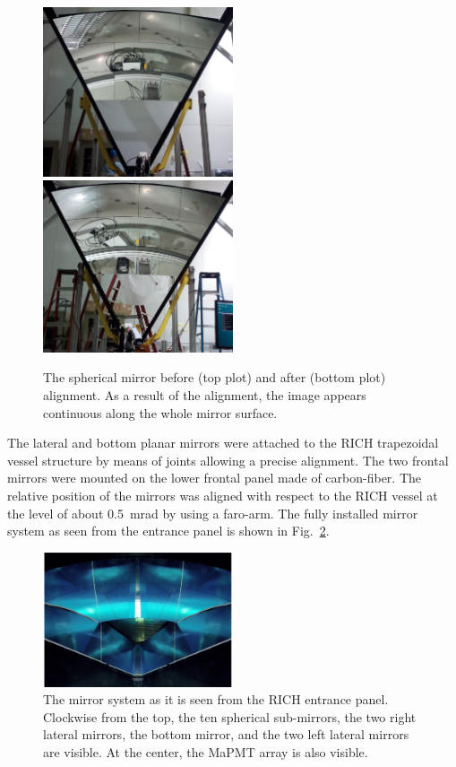 \documentclass[5p,times,twocolumn]{elsarticle}
\begin{document}
\begin{figure}
\begin{center}
\includegraphics[width=0.50\textwidth]{mirror_before.png}
\includegraphics[width=0.50\textwidth]{mirror_after.png}
\caption{The spherical mirror before (top plot) and after (bottom plot) alignment. As a result of the alignment, the image
  appears continuous along the whole mirror surface.}
\label{fig:MirAlign}
\end{center}
\end{figure}

The lateral and bottom planar mirrors were attached to the RICH trapezoidal vessel structure by means of
joints allowing a precise alignment. The two frontal mirrors
were mounted on the lower frontal panel made of carbon-fiber. The relative position of the mirrors was
aligned with respect to the RICH vessel at the level of about 0.5~mrad by using a faro-arm. The fully installed
mirror system as seen from the entrance panel is shown in Fig.~\ref{fig:mirrors}.

\begin{figure}
\begin{center}
\includegraphics[width=0.50\textwidth]{mirrors.pdf}
\caption{The mirror system as it is seen from the RICH entrance panel. Clockwise from the top, the ten spherical
  sub-mirrors, the two right lateral mirrors, the bottom mirror, and the two left lateral mirrors are visible. At the
  center, the MaPMT array is also visible.}
\label{fig:mirrors}
\end{center}
\end{figure}
\end{document}
